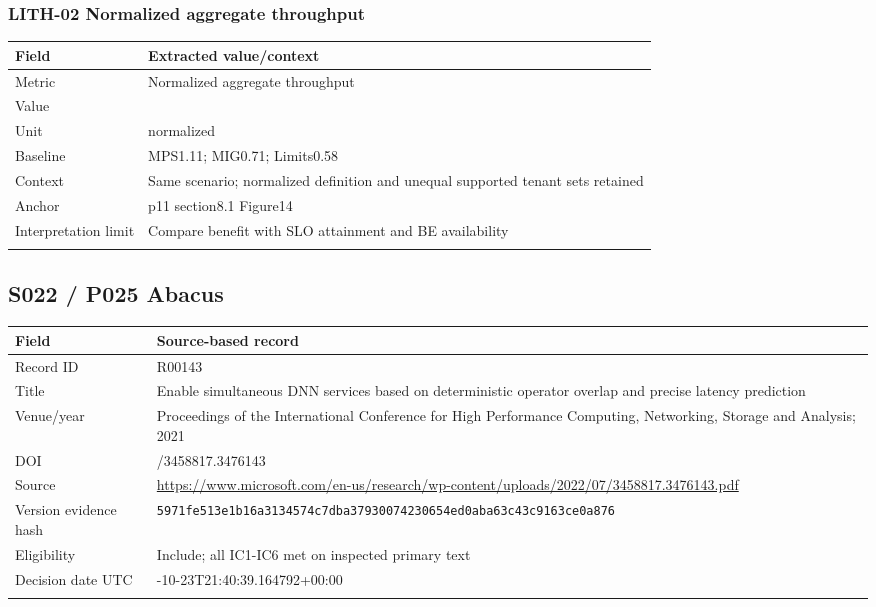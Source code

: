 \subsubsection*{LITH-02 Normalized aggregate throughput}
\begin{longtable}{>{\raggedright\arraybackslash}p{}>{\raggedright\arraybackslash}p{}}
\toprule
\textbf{Field} & \textbf{Extracted value/context}\\\midrule\endhead
Metric & Normalized aggregate throughput\\\addlinespace
Value & 1\\\addlinespace
Unit & normalized\\\addlinespace
Baseline & MPS1.11;\allowbreak{} MIG0.71;\allowbreak{} Limits0.58\\\addlinespace
Context & Same scenario;\allowbreak{} normalized definition and unequal supported tenant sets retained\\\addlinespace
Anchor & p11 section8.1 Figure14\\\addlinespace
Interpretation limit & Compare benefit with SLO attainment and BE availability\\\addlinespace
\bottomrule\end{longtable}
\clearpage\subsection{S022 / P025 Abacus}
\cite{s022}
\begin{longtable}{>{\raggedright\arraybackslash}p{}>{\raggedright\arraybackslash}p{}}
\toprule
\textbf{Field} & \textbf{Source-based record}\\\midrule\endhead
Record ID & R00143\\\addlinespace
Title & Enable simultaneous DNN services based on deterministic operator overlap and precise latency prediction\\\addlinespace
Venue/year & Proceedings of the International Conference for High Performance Computing,\allowbreak{} Networking,\allowbreak{} Storage and Analysis;\allowbreak{} 2021\\\addlinespace
DOI & 10.1145/3458817.3476143\\\addlinespace
Source & \url{https://www.microsoft.com/en-us/research/wp-content/uploads/2022/07/3458817.3476143.pdf}\\\addlinespace
Version evidence hash & \nolinkurl{5971fe513e1b16a3134574c7dba37930074230654ed0aba63c43c9163ce0a876}\\\addlinespace
Eligibility & Include;\allowbreak{} all IC1-IC6 met on inspected primary text\\\addlinespace
Decision date UTC & 2026-10-23T21:40:39.164792+00:00\\\addlinespace
\bottomrule\end{longtable}
